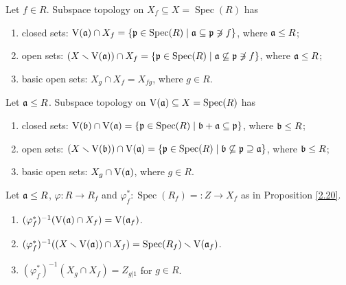 \begin{corollary}\label{2.23}
    Let $f \in R$. Subspace topology on $X_f \subseteq X = \operatorname{Spec}(R)$ has 
    \begin{enumerate}
        \item closed sets: $\operatorname{V}(\mathfrak{a}) \cap X_f = \{\mathfrak{p} \in \operatorname{Spec}(R) \mid \mathfrak{a} \subseteq \mathfrak{p} \not \ni f\}$, where $\mathfrak{a} \leq R$;
        \item open sets: $(X \smallsetminus \operatorname{V}(\mathfrak{a})) \cap X_f = \{\mathfrak{p} \in \operatorname{Spec}(R) \mid \mathfrak{a} \not \subseteq \mathfrak{p} \not \ni f\}$, where $\mathfrak{a} \leq R$;
        \item basic open sets: $X_g \cap X_f = X_{fg}$, where $g \in R$.
    \end{enumerate}
\end{corollary}

\begin{remark}
    Let $\mathfrak{a} \leq R$. Subspace topology on $\operatorname{V}(\mathfrak{a}) \subseteq X = \operatorname{Spec}(R)$ has 
    \begin{enumerate}
        \item closed sets: $\operatorname{V}(\mathfrak{b}) \cap \operatorname{V}(\mathfrak{a}) = \{\mathfrak{p} \in \operatorname{Spec}(R) \mid \mathfrak{b} + \mathfrak{a} \subseteq \mathfrak{p}\}$, where $\mathfrak{b} \leq R$;
        \item open sets: $(X \smallsetminus \operatorname{V}(\mathfrak{b})) \cap \operatorname{V}(\mathfrak{a}) = \{\mathfrak{p} \in \operatorname{Spec}(R) \mid \mathfrak{b} \not \subseteq \mathfrak{p} \supseteq \mathfrak{a}\}$, where $\mathfrak{b} \leq R$;
        \item basic open sets: $X_g \cap \operatorname{V}(\mathfrak{a})$, where $g \in R$.
    \end{enumerate}
\end{remark}

\begin{proposition}\label{2.24}
    Let $\mathfrak{a} \leq R$, $\varphi: R \to R_f$ and $\varphi_f^*: \operatorname{Spec}(R_f) =: Z \to X_f$ as in Proposition \ref{2.20}. 
    \begin{enumerate}
        \item\label{2.24a}
            $(\varphi_f^*)^{-1}(\operatorname{V}(\mathfrak{a}) \cap X_f) = \operatorname{V}(\mathfrak{a}_f)$. 
        \item\label{2.24b}
            $(\varphi_f^*)^{-1}((X \smallsetminus \operatorname{V}(\mathfrak{a})) \cap X_f) = \operatorname{Spec}(R_f) \smallsetminus \operatorname{V}(\mathfrak{a}_f)$.
        \item\label{2.24c} 
            $(\varphi_f^*)^{-1}(X_g \cap X_f) = Z_{g|1}$ for $g \in R$.
    \end{enumerate}
\end{proposition}

